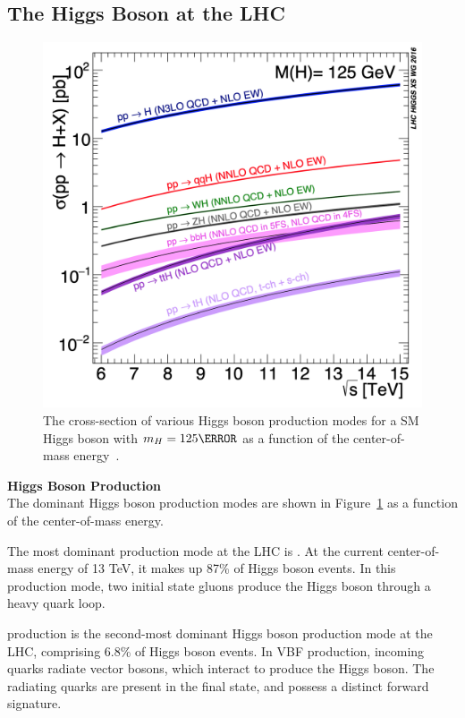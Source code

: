 \subsection{The Higgs Boson at the LHC}

\begin{figure}[!ht]
    \centering
    \includegraphics[width=.7\textwidth]{chapters/chapter1_theory/images/production_rates.png}
    \caption[The cross-section of various Higgs boson production modes for a as a function of the center-of-mass energy]{The cross-section of various Higgs boson production modes for a \gls{SM} Higgs boson with $m_{H}=\unit{125}{\GeV}$ as a function of the center-of-mass energy~\cite{hh-crosssections}.}
    \label{fig:higgs-production-modes}
\end{figure}
\noindent \textbf{Higgs Boson Production}\\
\indent The dominant Higgs boson production modes are shown in Figure~\ref{fig:higgs-production-modes} as a function of the center-of-mass energy.

The most dominant production mode at the \gls{LHC} is . At the current center-of-mass energy of 13 TeV, it makes up 87\% of Higgs boson events. In this production mode, two initial state gluons produce the Higgs boson through a heavy quark loop.

 production is the second-most dominant Higgs boson production mode at the \gls{LHC}, comprising 6.8\% of Higgs boson events. In \gls{VBF} production, incoming quarks radiate vector bosons, which interact to produce the Higgs boson. The radiating quarks are present in the final state, and possess a distinct forward signature.

